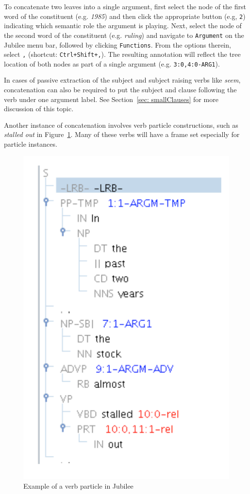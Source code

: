 \documentclass[11pt]{report}
\begin{document}
To concatenate two leaves into a single argument, first select the node of the first word of the constituent (e.g. \textit{1985}) and then click the appropriate button (e.g, \texttt{2}) indicating which semantic role the argument is playing.  Next, select the node of the second word of the constituent (e.g. \textit{ruling}) and navigate to {\tt Argument} on the Jubilee menu bar, followed by clicking {\tt Functions}.  From the options therein, select \texttt{,} (shortcut: \texttt{Ctrl+Shift+,}). The resulting annotation will reflect the tree location of both nodes as part of a single argument (e.g. {\tt 3:0,4:0-ARG1}).

In cases of passive extraction of the subject and subject raising verbs like \textit{seem}, concatenation can also be required to put the subject and clause following the verb under one argument label.  See Section~\ref{sec: smallClauses} for more discussion of this topic.  

Another instance of concatenation involves verb particle constructions, such as \textit{stalled out} in Figure~\ref{fig: PRTconcat}. Many of these verbs will have a frame set especially for particle instances.

\begin{figure}[htbp]
\centering
\includegraphics[scale=0.4]{img/PRTconcat.png}
\caption{Example of a verb particle in Jubilee}
\label{fig: PRTconcat}
\end{figure}
\end{document}
